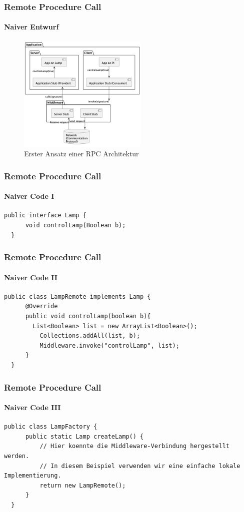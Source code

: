 \begin{frame}
  \frametitle{Remote Procedure Call}
  \framesubtitle{Naiver Entwurf}
  \begin{figure}[!ht]
    \centering
    \includegraphics[width=0.55\textwidth]{fig/uml/rpc-simple.png}
    \caption{Erster Ansatz einer RPC Architektur}
    \label{fig:simple-rpc}
  \end{figure}
\end{frame}

\begin{frame}[fragile]
  \frametitle{Remote Procedure Call}
  \framesubtitle{Naiver Code I}
  \begin{minipage}{\textwidth}
  \begin{lstlisting}[caption={RPC Interface},captionpos=b,label={lst:rpc-interface}]
  public interface Lamp {
      void controlLamp(Boolean b);
  }
  \end{lstlisting}
  \end{minipage}
\end{frame}

\begin{frame}[fragile]
  \frametitle{Remote Procedure Call}
  \framesubtitle{Naiver Code II}
  \begin{minipage}{\textwidth}
  \begin{lstlisting}[caption={RPC Remote Implementation},captionpos=b,label={lst:rpc-remote}]
  public class LampRemote implements Lamp {
      @Override
      public void controlLamp(boolean b){
        List<Boolean> list = new ArrayList<Boolean>(); 
          Collections.addAll(list, b);
          Middleware.invoke("controlLamp", list);
      }
  }
  \end{lstlisting}
  \end{minipage}
\end{frame}

\begin{frame}[fragile]
  \frametitle{Remote Procedure Call}
  \framesubtitle{Naiver Code III}
  \begin{minipage}{\textwidth}
  \begin{lstlisting}[caption={Application Stub mit Factory Pattern},captionpos=b,label={lst:rpc-factory}]
  public class LampFactory {
      public static Lamp createLamp() {
          // Hier koennte die Middleware-Verbindung hergestellt werden.
          // In diesem Beispiel verwenden wir eine einfache lokale Implementierung.
          return new LampRemote();
      }
  }
  \end{lstlisting}
  \end{minipage}
\end{frame}

